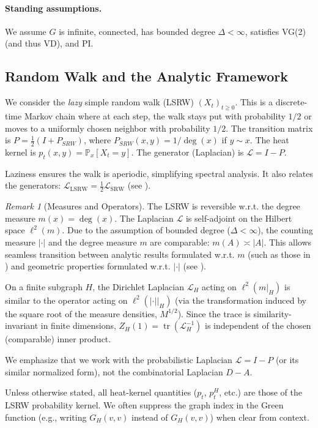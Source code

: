\documentclass{article}
\numberwithin{equation}{section}
\theoremstyle{definition}
\theoremstyle{remark}
\newtheorem{remark}[theorem]{Remark}
\DeclareMathOperator{\tr}{tr}
\newcommand{\LL}{\mathcal{L}}
\newcommand{\Prob}{\mathbb{P}}
\begin{document}
\paragraph{Standing assumptions.} We assume $G$ is infinite, connected, has bounded degree $\Delta < \infty$, satisfies VG(2) (and thus VD), and PI.

\subsection{Random Walk and the Analytic Framework}
We consider the \emph{lazy} simple random walk (LSRW) $(X_t)_{t \geq 0}$. This is a discrete-time Markov chain where at each step, the walk stays put with probability $1/2$ or moves to a uniformly chosen neighbor with probability $1/2$. The transition matrix is $P = \frac{1}{2}(I + P_{SRW})$, where $P_{SRW}(x,y) = 1/\deg(x)$ if $y \sim x$. The heat kernel is $p_t(x,y) = \Prob_x[X_t = y]$. The generator (Laplacian) is $\LL = I - P$.

Laziness ensures the walk is aperiodic, simplifying spectral analysis. It also relates the generators: $\LL_{\text{LSRW}} = \frac{1}{2} \LL_{\text{SRW}}$ (see ).

\begin{remark}[Measures and Operators]\label{rem:measures_operators}
The LSRW is reversible w.r.t. the degree measure $m(x)=\deg(x)$. The Laplacian $\LL$ is self-adjoint on the Hilbert space $\ell^2(m)$. Due to the assumption of bounded degree ($\Delta < \infty$), the counting measure $|\cdot|$ and the degree measure $m$ are comparable: $m(A) \asymp |A|$. This allows seamless transition between analytic results formulated w.r.t. $m$ (such as those in ) and geometric properties formulated w.r.t. $|\cdot|$ (see \cite{Coulhon03}).

On a finite subgraph $H$, the Dirichlet Laplacian $\LL_H$ acting on $\ell^2(m|_H)$ is similar to the operator acting on $\ell^2(|\cdot||_H)$ (via the transformation induced by the square root of the measure densities, $M^{1/2}$). Since the trace is similarity-invariant in finite dimensions, $Z_H(1) = \tr(\LL_H^{-1})$ is independent of the chosen (comparable) inner product.

We emphasize that we work with the probabilistic Laplacian $\LL=I-P$ (or its similar normalized form), not the combinatorial Laplacian $D-A$.

Unless otherwise stated, all heat-kernel quantities ($p_t$, $p_t^H$, etc.) are those of the LSRW probability kernel. We often suppress the graph index in the Green function (e.g., writing $G_H(v,v)$ instead of $G_{H}(v,v)$) when clear from context.
\end{remark}
\end{document}
